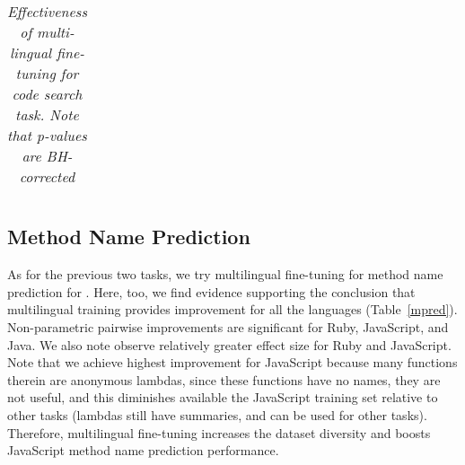 \begin{table*}[h]
{\begin{tabular}{lcccccccccccc}
\end{tabular}
}
\vspace{0.05in}
\caption{{\em {\small Effectiveness of multi-lingual fine-tuning for code search task. Note that p-values are BH-corrected}}}

\label{csearch}
\vspace{-0.2in}
\end{table*}





\subsection{Method Name Prediction}

As for the previous two tasks, we try multilingual fine-tuning for method name prediction for \cbert.   
Here, too, we find evidence supporting the conclusion that multilingual training provides improvement for all the languages (Table~\ref{mpred}). Non-parametric pairwise improvements are significant for Ruby, JavaScript, and Java. We also  note observe relatively greater effect size for Ruby and JavaScript. 
Note that we achieve highest improvement for JavaScript because many functions therein are anonymous lambdas, 
since these functions have no names, they are not useful, and this diminishes available the JavaScript training set  relative to other tasks 
(lambdas still have summaries, and can be used for other tasks). Therefore, multilingual fine-tuning increases the dataset diversity and boosts JavaScript method name prediction performance. 



